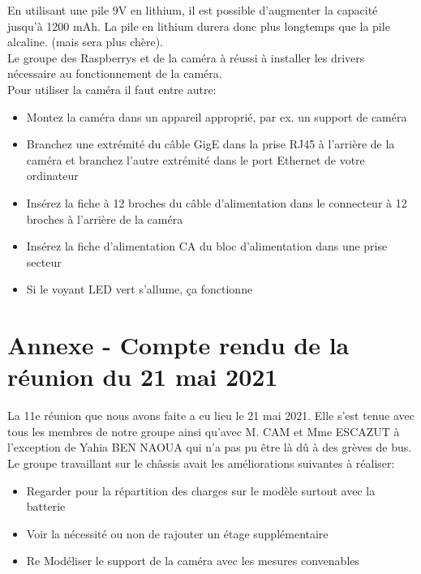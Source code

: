 \documentclass{PackagerQualityN}
\begin{document}
En utilisant une pile 9V en lithium, il est possible d’augmenter la capacité jusqu’à 1200 mAh. La pile en lithium durera donc plus longtemps que la pile alcaline. (mais sera plus chère).
 \\
 
Le groupe des Raspberrys et de la caméra à réussi à installer les drivers nécessaire au fonctionnement de la caméra.\\
 
Pour utiliser la caméra il faut entre autre:
\begin{itemize}
    \item Montez la caméra dans un appareil approprié, par ex. un support de caméra
    \item Branchez une extrémité du câble GigE dans la prise RJ45 à l'arrière de la caméra et branchez l'autre extrémité dans le port Ethernet de votre ordinateur
    \item Insérez la fiche à 12 broches du câble d'alimentation dans le connecteur à 12 broches à l'arrière de la caméra
    \item Insérez la fiche d'alimentation CA du bloc d'alimentation dans une prise secteur
    \item Si le voyant LED vert s'allume, ça fonctionne
\end{itemize}

\newp
\section*{Annexe - Compte rendu de la réunion du 21 mai 2021}
La 11e réunion que nous avons faite a eu lieu le 21 mai 2021. Elle s'est tenue avec tous les membres de notre groupe ainsi qu'avec M. CAM et Mme ESCAZUT à l'exception de Yahia BEN NAOUA qui n'a pas pu être là dû à des grèves de bus.\\

Le groupe travaillant sur le châssis avait les améliorations suivantes à réaliser:

\begin{itemize}
    \item Regarder pour la répartition des charges sur le modèle surtout avec la batterie
    \item Voir la nécessité ou non de rajouter un étage supplémentaire 
    \item Re Modéliser le support de la caméra avec les mesures convenables\\
\end{itemize}
\end{document}
